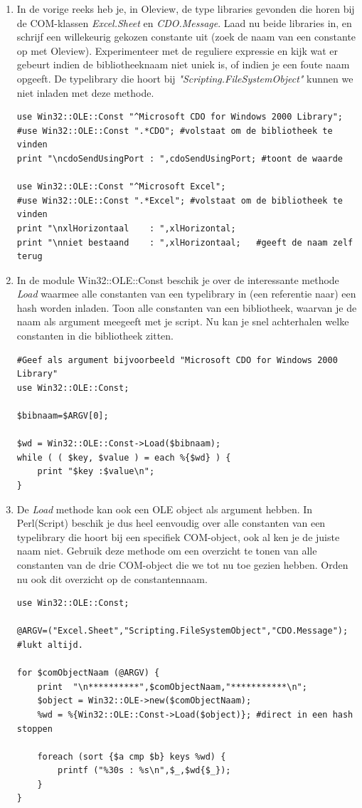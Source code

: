 \documentclass[11pt,a4paper]{report}
\begin{document}
\begin{enumerate}[resume]
	\item In de vorige reeks heb je, in Oleview, de type libraries gevonden die horen bij de COM-klassen \textit{Excel.Sheet} en \textit{CDO.Message}. Laad nu beide libraries in, en schrijf een willekeurig gekozen constante uit (zoek de naam van een constante op met Oleview). Experimenteer met de reguliere expressie en kijk wat er gebeurt indien de bibliotheeknaam niet uniek is, of indien je een foute naam opgeeft.
	De typelibrary die hoort bij \textit{"Scripting.FileSystemObject"} kunnen we niet inladen met deze methode.
\begin{lstlisting}
use Win32::OLE::Const "^Microsoft CDO for Windows 2000 Library";
#use Win32::OLE::Const ".*CDO"; #volstaat om de bibliotheek te vinden
print "\ncdoSendUsingPort : ",cdoSendUsingPort; #toont de waarde

use Win32::OLE::Const "^Microsoft Excel";      
#use Win32::OLE::Const ".*Excel"; #volstaat om de bibliotheek te vinden
print "\nxlHorizontaal    : ",xlHorizontal;
print "\nniet bestaand    : ",xlHorizontaal;   #geeft de naam zelf terug
\end{lstlisting}
	\item In de module Win32::OLE::Const beschik je over de interessante methode \textit{Load} waarmee alle constanten van een typelibrary in (een referentie naar) een hash worden inladen. Toon alle constanten van een bibliotheek, waarvan je de naam als argument meegeeft met je script.
	Nu kan je snel achterhalen welke constanten in die bibliotheek zitten.
\begin{lstlisting}
#Geef als argument bijvoorbeeld "Microsoft CDO for Windows 2000 Library"
use Win32::OLE::Const;

$bibnaam=$ARGV[0];

$wd = Win32::OLE::Const->Load($bibnaam);
while ( ( $key, $value ) = each %{$wd} ) {
	print "$key :$value\n";
}
\end{lstlisting}
	\item De \textit{Load} methode kan ook een OLE object als argument hebben. In Perl(Script) beschik je dus heel eenvoudig over alle constanten van een typelibrary die hoort bij een specifiek COM-object, ook al ken je de juiste naam niet.
	Gebruik deze methode om een overzicht te tonen van alle constanten van de drie COM-object die we tot nu toe gezien hebben. Orden nu ook dit overzicht op de constantennaam.
\begin{lstlisting}
use Win32::OLE::Const;

@ARGV=("Excel.Sheet","Scripting.FileSystemObject","CDO.Message"); #lukt altijd.

for $comObjectNaam (@ARGV) {
	print  "\n**********",$comObjectNaam,"***********\n";
	$object = Win32::OLE->new($comObjectNaam);
	%wd = %{Win32::OLE::Const->Load($object)}; #direct in een hash stoppen
	
	foreach (sort {$a cmp $b} keys %wd) {
		printf ("%30s : %s\n",$_,$wd{$_});
	}  
}
\end{lstlisting}
\end{enumerate}
\end{document}
